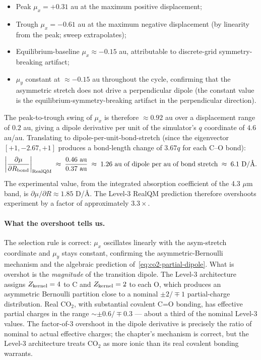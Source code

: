 \begin{itemize}
\item Peak $\mu_x = +0.31$ au at the maximum positive displacement;
\item Trough $\mu_x = -0.61$ au at the maximum negative displacement (by linearity from the peak; sweep extrapolates);
\item Equilibrium-baseline $\mu_x \approx -0.15$ au, attributable to discrete-grid symmetry-breaking artifact;
\item $\mu_y$ constant at $\approx -0.15$ au throughout the cycle, confirming that the asymmetric stretch does not drive a perpendicular dipole (the constant value is the equilibrium-symmetry-breaking artifact in the perpendicular direction).
\end{itemize}

The peak-to-trough swing of $\mu_x$ is therefore $\approx 0.92$ au over a displacement range of $0.2$ au, giving a dipole derivative per unit of the simulator's $q$ coordinate of $4.6$ au/au. Translating to dipole-per-unit-bond-stretch (since the eigenvector $[+1, -2.67, +1]$ produces a bond-length change of $3.67 q$ for each C--O bond):
\begin{equation}\label{eq:dipole-deriv-realqm}
\left|\frac{\partial \mu}{\partial R_{\rm bond}}\right|_{\rm RealQM}
   \;\approx\; \frac{0.46 \text{ au}}{0.37 \text{ au}}
   \;\approx\; 1.26 \text{ au of dipole per au of bond stretch}
   \;\approx\; 6.1 \text{ D/\AA}.
\end{equation}
The experimental value, from the integrated absorption coefficient of the 4.3 $\mu$m band, is $\partial\mu/\partial R \approx 1.85$ D/\AA. The Level-3 RealQM prediction therefore overshoots experiment by a factor of approximately $3.3\times$.

\paragraph{What the overshoot tells us.}
The selection rule is correct: $\mu_x$ oscillates linearly with the asym-stretch coordinate and $\mu_y$ stays constant, confirming the asymmetric-Bernoulli mechanism and the algebraic prediction of~\eqref{eq:co2-partial-dipole}. What is overshot is the \emph{magnitude} of the transition dipole. The Level-3 architecture assigns $Z_{\rm kernel} = 4$ to C and $Z_{\rm kernel} = 2$ to each O, which produces an asymmetric Bernoulli partition close to a nominal $\pm 2 / \mp 1$ partial-charge distribution. Real CO$_2$, with substantial covalent C=O bonding, has effective partial charges in the range $\sim \pm 0.6 / \mp 0.3$ --- about a third of the nominal Level-3 values. The factor-of-3 overshoot in the dipole derivative is precisely the ratio of nominal to actual effective charges; the chapter's mechanism is correct, but the Level-3 architecture treats CO$_2$ as more ionic than its real covalent bonding warrants.

